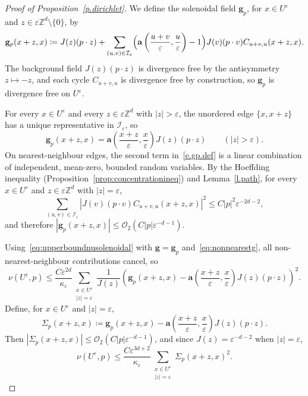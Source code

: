 \documentclass[11pt]{amsart}
\theoremstyle{plain}
\theoremstyle{definition}
\theoremstyle{remark}
\newcommand{\Zd}{\mathbb{Z}^d}
\renewcommand{\a}{\mathbf{a}}
\newcommand{\eps}{\varepsilon}
\begin{document}
\begin{proof}[Proof of Proposition~\ref{p.dirichlet}]
		We define the solenoidal field $\mathbf{g}_p$, for $x \in U^\eps$ and $z \in \eps\Zd \setminus \{0\}$, by
		\begin{equation}
			\label{e.gp.def}
			\mathbf{g}_p(x+z,x) \coloneqq J(z)(p \cdot z) + \sum_{(u,v) \in \mathcal{I}_\eps} \Bigl(\a\left(\frac{u+v}{\eps},\frac{u}{\eps}\right) - 1\Bigr) J(v)(p \cdot v) C_{u+v,u}(x+z,x).
		\end{equation}
		The background field $J(z)(p \cdot z)$ is divergence free by the antisymmetry $z \mapsto -z$, and each cycle $C_{u+v,u}$ is divergence free by construction, so $\mathbf{g}_p$ is divergence free on $U^\eps$.
		
		For every $x \in U^\eps$ and every $z \in \eps\Zd$ with $|z| > \eps$, the unordered edge $\{x, x+z\}$ has a unique representative in $\mathcal{I}_\eps$, so
		\begin{equation} \label{eq:nonnearestg}
			\mathbf{g}_p(x+z,x) = \a\left(\frac{x+z}{\eps},\frac{x}{\eps}\right) J(z)(p \cdot z) \qquad (|z| > \eps).
		\end{equation}
		On nearest-neighbour edges, the second term in~\eqref{e.gp.def} is a linear combination of independent, mean-zero, bounded random variables.
		By the Hoeffding inequality (Proposition~\ref{prop:concentrationineq}) and Lemma~\ref{l.path}, for every $x \in U^\eps$ and $z \in \eps\Zd$ with $|z| = \eps$,
		\begin{equation} \label{ineqforgp}
			\sum_{(u,v) \in \mathcal{I}_\eps} \left|J(v)(p \cdot v) C_{u+v,u}(x+z,x)\right|^2 \le C|p|^2 \eps^{-2d-2},
		\end{equation}
		and therefore $|\mathbf{g}_p(x+z,x)| \le \mathcal{O}_2(C|p|\eps^{-d-1})$.
		
		Using~\eqref{eq:upperboundnusolenoidal} with $\mathbf{g} = \mathbf{g}_p$ and~\eqref{eq:nonnearestg}, all non-nearest-neighbour contributions cancel, so
		\[
		\nu(U^\eps, p) \le \frac{C\eps^{2d}}{\kappa_\eps} \sum_{\substack{x \in U^\eps \\ |z| = \eps}} \frac{1}{J(z)} \left(\mathbf{g}_p(x+z,x) - \a\left(\frac{x+z}{\eps},\frac{x}{\eps}\right) J(z)(p \cdot z)\right)^2.
		\]
		Define, for $x \in U^\eps$ and $|z| = \eps$,
		\begin{equation} \label{def:defsigmap}
			\Sigma_p(x+z,x) \coloneqq \mathbf{g}_p(x+z,x) - \a\left(\frac{x+z}{\eps},\frac{x}{\eps}\right) J(z)(p \cdot z).
		\end{equation}
		Then $|\Sigma_p(x+z,x)| \le \mathcal{O}_2(C|p|\eps^{-d-1})$, and since $J(z) = \eps^{-d-2}$ when $|z| = \eps$,
		\begin{equation} \label{eq:defnepsstep2}
			\nu(U^\eps, p) \le \frac{C\eps^{3d+2}}{\kappa_\eps} \sum_{\substack{x \in U^\eps \\ |z| = \eps}} \Sigma_p(x+z,x)^2.
		\end{equation}
		

\end{proof}
\end{document}
